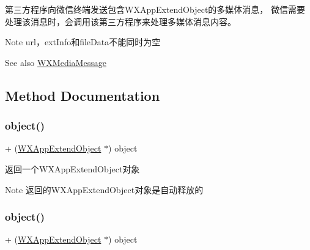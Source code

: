 第三方程序向微信终端发送包含\+W\+X\+App\+Extend\+Object的多媒体消息， 微信需要处理该消息时，会调用该第三方程序来处理多媒体消息内容。 \begin{DoxyNote}{Note}
url，ext\+Info和file\+Data不能同时为空 
\end{DoxyNote}
\begin{DoxySeeAlso}{See also}
\mbox{\hyperlink{interface_w_x_media_message}{W\+X\+Media\+Message}} 
\end{DoxySeeAlso}


\subsection{Method Documentation}
\mbox{\label{interface_w_x_app_extend_object_af81c54295af4cf412d71ec98d462fc84}} 
\subsubsection{\texorpdfstring{object()}{object()}\hspace{0.1cm}{\footnotesize\ttfamily [1/3]}}
{\footnotesize\ttfamily + (\mbox{\hyperlink{interface_w_x_app_extend_object}{W\+X\+App\+Extend\+Object}} $\ast$) object \begin{DoxyParamCaption}{ }\end{DoxyParamCaption}}



返回一个\+W\+X\+App\+Extend\+Object对象 

\begin{DoxyNote}{Note}
返回的\+W\+X\+App\+Extend\+Object对象是自动释放的 
\end{DoxyNote}
\mbox{\label{interface_w_x_app_extend_object_af81c54295af4cf412d71ec98d462fc84}} 
\subsubsection{\texorpdfstring{object()}{object()}\hspace{0.1cm}{\footnotesize\ttfamily [2/3]}}
{\footnotesize\ttfamily + (\mbox{\hyperlink{interface_w_x_app_extend_object}{W\+X\+App\+Extend\+Object}} $\ast$) object \begin{DoxyParamCaption}{ }\end{DoxyParamCaption}}



